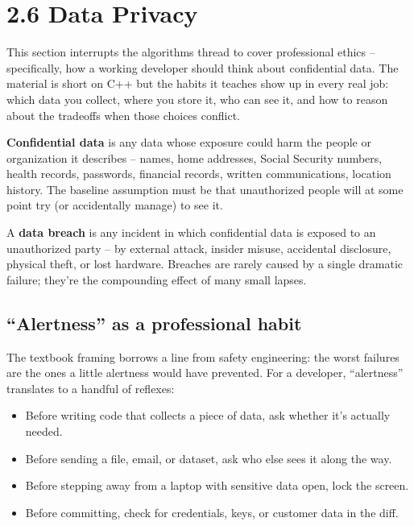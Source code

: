 \documentclass[11pt]{article}
\begin{document}
\section{2.6 Data Privacy}

This section interrupts the algorithms thread to cover professional
ethics -- specifically, how a working developer should think about
confidential data. The material is short on C++ but the habits it
teaches show up in every real job: which data you collect, where you
store it, who can see it, and how to reason about the tradeoffs when
those choices conflict.

\begin{defnbox}
\textbf{Confidential data} is any data whose exposure could harm the
people or organization it describes -- names, home addresses, Social
Security numbers, health records, passwords, financial records,
written communications, location history. The baseline assumption
must be that unauthorized people will at some point try (or
accidentally manage) to see it.
\end{defnbox}

\begin{defnbox}
A \textbf{data breach} is any incident in which confidential data is
exposed to an unauthorized party -- by external attack, insider
misuse, accidental disclosure, physical theft, or lost hardware.
Breaches are rarely caused by a single dramatic failure; they're the
compounding effect of many small lapses.
\end{defnbox}

\subsection{``Alertness'' as a professional habit}

The textbook framing borrows a line from safety engineering: the worst
failures are the ones a little alertness would have prevented. For a
developer, ``alertness'' translates to a handful of reflexes:

\begin{itemize}[leftmargin=*]
    \item Before writing code that collects a piece of data, ask
          whether it's actually needed.
    \item Before sending a file, email, or dataset, ask who else sees
          it along the way.
    \item Before stepping away from a laptop with sensitive data open,
          lock the screen.
    \item Before committing, check for credentials, keys, or customer
          data in the diff.
\end{itemize}
\end{document}
